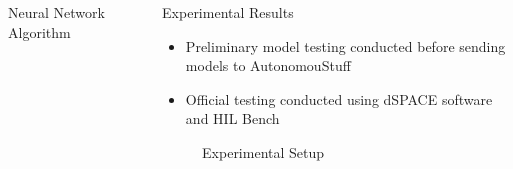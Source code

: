 \documentclass[final]{beamer}
\newlength{\sepwid}
\newlength{\onecolwid}
\begin{document}
\begin{frame}[t]
\begin{columns}[t]
\begin{column}{\onecolwid}
\begin{alertblock}{Neural Network Algorithm}
\vskip -2.5cm
\end{alertblock}



\end{column} %

\begin{column}{\sepwid}\end{column}

\begin{column}{\onecolwid} %


\begin{alertblock}{Experimental Results}
\vskip 1cm
\begin{itemize}
    \item Preliminary model testing conducted before sending models to AutonomouStuff 
    \item Official testing conducted using dSPACE software and HIL Bench 
\end{itemize}
\begin{figure}
    \centering
    \caption{Experimental Setup}
    \label{fig:Setup}
\end{figure}


\end{alertblock}
\end{column}
\end{columns}
\end{frame}
\end{document}
